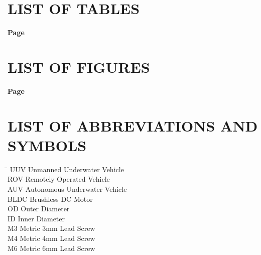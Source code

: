 
\cleardoublepage
\makeatletter
\chapter*{LIST OF TABLES}
\vspace{1.5\baselineskip}
\hfill{\bfseries Page}\par\vspace{.5\baselineskip}
\makeatother
\cleardoublepage

\makeatletter
\chapter*{LIST OF FIGURES}
\vspace{1.5\baselineskip}
\hfill{\bfseries Page}\par\vspace{.5\baselineskip}
\makeatother

\cleardoublepage
\makeatletter
\chapter*{LIST OF ABBREVIATIONS AND SYMBOLS}

\vspace{1.5\baselineskip}
\noindent
\begin{tabbing}
\hspace{2.5cm}\=\kill
UUV \> Unmanned Underwater Vehicle \\
ROV \> Remotely Operated Vehicle \\
AUV \> Autonomous Underwater Vehicle \\
BLDC \> Brushless DC Motor \\
OD \> Outer Diameter \\
ID \> Inner Diameter \\
M3 \> Metric 3mm Lead Screw \\
M4 \> Metric 4mm Lead Screw \\
M6 \> Metric 6mm Lead Screw \\
\end{tabbing}
\makeatother
